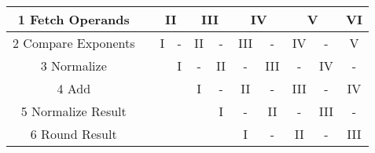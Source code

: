 \documentclass[11pt]{article}
\begin{document}
\begin{enumerate}
\begin{itemize}
\begin{table}[!htb]
\begin{tabular}{|c|c|l|c|c|c|c|c|c|c|c|c|}
1  Fetch Operands                         & \multicolumn{2}{c|}{\cellcolor[HTML]{6434FC}{\color[HTML]{333333} I}} & \multicolumn{2}{c|}{\cellcolor[HTML]{00D2CB}II}                        & \multicolumn{2}{c|}{\cellcolor[HTML]{32CB00}III}        & \multicolumn{2}{c|}{\cellcolor[HTML]{FFC702}IV}           & \multicolumn{2}{c|}{\cellcolor[HTML]{CB0000}V}            & \multicolumn{1}{r|}{\cellcolor[HTML]{9B9B9B}VI} \\ \hline
2 Compare Exponents                       & \multicolumn{2}{c|}{}                                                 & \cellcolor[HTML]{6434FC}I                  & \cellcolor[HTML]{6665CD}- & \cellcolor[HTML]{00D2CB}II & \cellcolor[HTML]{68CBD0}-  & \cellcolor[HTML]{32CB00}III & \cellcolor[HTML]{34FF34}-   & \cellcolor[HTML]{FFC702}IV  & \cellcolor[HTML]{F8FF00}-   & \cellcolor[HTML]{CB0000}V                       \\ \cline{1-1} \cline{4-12} 
3 Normalize                               & \multicolumn{2}{c|}{}                                                 & \cellcolor[HTML]{FFFFFF}                   & \cellcolor[HTML]{6434FC}I & \cellcolor[HTML]{6665CD}-  & \cellcolor[HTML]{00D2CB}II & \cellcolor[HTML]{68CBD0}-   & \cellcolor[HTML]{32CB00}III & \cellcolor[HTML]{34FF34}-   & \cellcolor[HTML]{FFC702}IV  & \cellcolor[HTML]{F8FF00}-                       \\ \cline{1-1} \cline{5-12} 
4 Add                                     & \multicolumn{2}{c|}{}                                                 & \cellcolor[HTML]{FFFFFF}                   &                           & \cellcolor[HTML]{6434FC}I  & \cellcolor[HTML]{6665CD}-  & \cellcolor[HTML]{00D2CB}II  & \cellcolor[HTML]{68CBD0}-   & \cellcolor[HTML]{32CB00}III & \cellcolor[HTML]{34FF34}-   & \cellcolor[HTML]{FFC702}IV                      \\ \cline{1-1} \cline{6-12} 
5 Normalize Result                        & \multicolumn{2}{c|}{}                                                 & \cellcolor[HTML]{FFFFFF}                   &                           &                            & \cellcolor[HTML]{6434FC}I  & \cellcolor[HTML]{6665CD}-   & \cellcolor[HTML]{00D2CB}II  & \cellcolor[HTML]{68CBD0}-   & \cellcolor[HTML]{32CB00}III & \cellcolor[HTML]{34FF34}-                       \\ \cline{1-1} \cline{7-12} 
6 Round Result                            & \multicolumn{2}{c|}{}                                                 & \cellcolor[HTML]{FFFFFF}                   &                           &                            &                            & \cellcolor[HTML]{6434FC}I   & \cellcolor[HTML]{6665CD}-   & \cellcolor[HTML]{00D2CB}II  & \cellcolor[HTML]{68CBD0}-   & \cellcolor[HTML]{32CB00}III                     \\ \cline{1-1} \cline{8-12} 

\end{tabular}
\end{table}
\end{itemize}
\end{enumerate}
\end{document}
